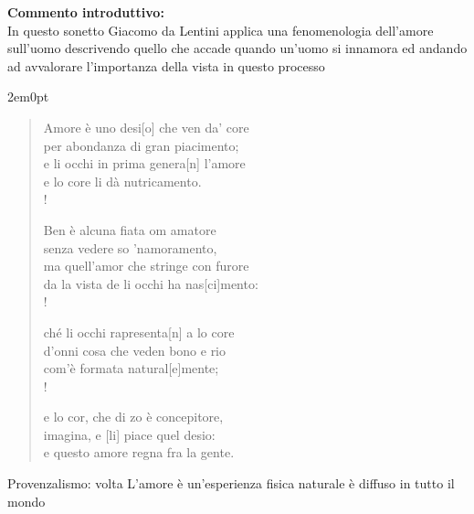 \newpage
\hypertarget{para:amorun}{}


\textbf{Commento introduttivo:}\\
In questo sonetto Giacomo da Lentini applica una fenomenologia dell'amore sull'uomo descrivendo quello che accade quando un'uomo si innamora ed andando ad avvalorare l'importanza della vista in questo processo

\vspace{1.5em}

\begin{adjustwidth}{2em}{0pt}
\verselinenumbersleft
\begin{verse}
Amore è uno desi[o] che ven da’ core \\
per abondanza di gran piacimento; \\
e li occhi in prima genera[n] l’amore \\
e lo core li dà nutricamento. \\!

Ben è alcuna fiata om amatore \label{v5}\\
senza vedere so ’namoramento, \\
ma quell’amor che stringe con furore \\ 
da la vista de li occhi ha nas[ci]mento: \\!

ché li occhi rapresenta[n] a lo core \\
d’onni cosa che veden bono e rio  \\
com’è formata natural[e]mente; \label{v11}\\!

e lo cor, che di zo è concepitore, \\
imagina, e [li] piace quel desio: \\
e questo amore regna fra la gente. \label{v14}\\
\end{verse}
\end{adjustwidth}

\vspace{1.5em}

\begin{commentaries}
     Provenzalismo: volta
     L'amore è un'esperienza fisica naturale
     è diffuso in tutto il mondo
\end{commentaries}

